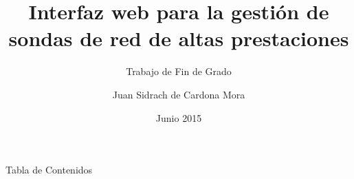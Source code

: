 \documentclass[10pt, compress]{beamer}
\title{Interfaz web para la gestión de sondas de red de altas prestaciones}
\subtitle{Trabajo de Fin de Grado}
\date{Junio 2015}
\author{Juan Sidrach de Cardona Mora}
\begin{document}
\maketitle

\begin{frame}{Tabla de Contenidos}
  \tableofcontents
\end{frame}













\end{document}
